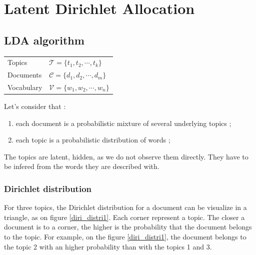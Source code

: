 \documentclass[a4paper,twoside,12pt,openright]{report}
\begin{document}
\newpage
\section{Latent Dirichlet Allocation}
\label{LDASec}

\subsection{LDA algorithm}

\begin{center}
\begin{tabular}{ll}
Topics & $ \mathcal{T} = \{t_1,t_2,\cdots,t_k\} $ \\
Documents & $ \mathcal{C} = \{d_1,d_2,\cdots,d_m\} $ \\
Vocabulary & $ \mathcal{V} = \{w_1,w_2,\cdots,w_n\} $ \\
\end{tabular}
\end{center}

Let's consider that : 
\begin{enumerate}
\item each document is a probabilistic mixture of several underlying topics ;
\item each topic is a probabilistic distribution of words ;
\end{enumerate}

The topics are latent, hidden, as we do not observe them directly. They have to be infered from the words they are described with.

\subsubsection{Dirichlet distribution}
For three topics, the Dirichlet distribution for a document can be visualize in a triangle, as on figure \ref{diri_distri1}. Each corner represent a topic. The closer a document is to a corner, the higher is the probability that the document belongs to the topic. For example, on the figure \ref{diri_distri1}, the document belongs to the topic 2 with an higher probability than with the topics 1 and 3.
\end{document}
